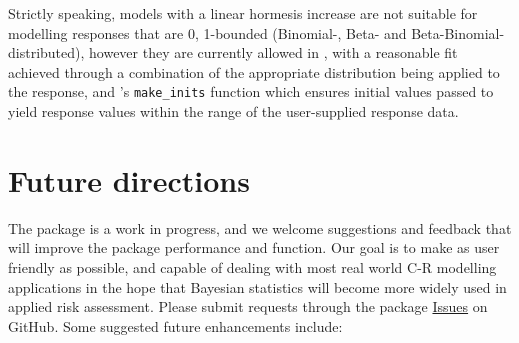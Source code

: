 \documentclass[
  shortnames]{jss}
\begin{document}
Strictly speaking, models with a linear hormesis increase are not suitable for modelling responses that are 0, 1-bounded (Binomial-, Beta- and Beta-Binomial-distributed), however they are currently allowed in , with a reasonable fit achieved through a combination of the appropriate distribution being applied to the response, and 's \texttt{make\_inits} function which ensures initial values passed to  yield response values within the range of the user-supplied response data.

\hypertarget{future-directions}{%
\section{Future directions}\label{future-directions}}

The  package is a work in progress, and we welcome suggestions and feedback that will improve the package performance and function. Our goal is to make  as user friendly as possible, and capable of dealing with most real world C-R modelling applications in the hope that Bayesian statistics will become more widely used in applied risk assessment. Please submit requests through the package \href{https://github.com/open-AIMS/bayesnec/issues}{Issues} on GitHub. Some suggested future enhancements include:
\end{document}
